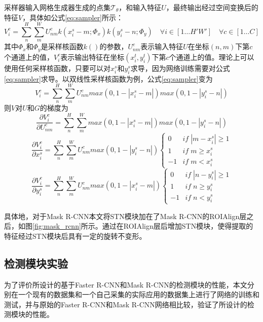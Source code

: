 采样器输入网格生成器生成的点集$\mathcal{T}_\theta$，和输入特征$U$，最终输出经过空间变换后的特征$V$，具体如公式\ref{eq:sampler}所示：
\begin{equation}
  \label{eq:sampler}
  V_i^c = \sum_n^H\sum_m^W{U_{nm}^ck(x_i^s-m;\Phi_x)k(y_i^s-n;\Phi_y)}\quad \forall i\in[1\ldots H'W']\quad \forall c\in[1\ldots C]
\end{equation}
其中$\Phi_{x}$和$\Phi_{y}$是采样核函数$k()$的参数，$U_{nm}^c$表示输入特征$U$在坐标$(n, m)$下第$c$个通道上的值，$V_i^c$表示输出特征在坐标$(x_i^t,y_i^t)$下第$c$个通道上的值。理论上可以使用任何采样核函数，只要可以对$x_i^s$和$y_i^s$求导，因为网络训练需要对公式\ref{eq:sampler}求导。以双线性采样核函数为例，公式\ref{eq:sampler}变为
\begin{equation}
  V_i^c = \sum_n^H\sum_m^W{U_{nm}^cmax(0, 1-|x_i^s-m|)max(0, 1-|y_i^s-n|)}
\end{equation}
则$V$对$U$和$G$的梯度为
\begin{equation}
  \frac{\partial V_i^c}{\partial U_{nm}^c} = \sum_n^H\sum_m^W{max(0, 1-|x_i^s-m|)max(0, 1-|y_i^s-n|)}
\end{equation}
\begin{equation}
  \frac{\partial V_i^c}{\partial x_i^s} = \sum_n^H\sum_m^W{U_{nm}^cmax(0, 1-|y_i^s-n|)}
  \left\{
      \begin{array}{ll}
        0&if\; |m-x_i^s| \geq 1\\
        1&if\; m \geq x_i^s\\
        -1&if\; m < x_i^s
      \end{array}
    \right.
\end{equation}
\begin{equation}
  \frac{\partial V_i^c}{\partial y_i^s} = \sum_n^H\sum_m^W{U_{nm}^cmax(0, 1-|x_i^s-m|)}
  \left\{
      \begin{array}{ll}
        0&if\; |n-y_i^s| \geq 1\\
        1&if\; n \geq y_i^s\\
        -1&if\; n < y_i^s
      \end{array}
    \right.
\end{equation}

具体地，对于Mask R-CNN本文将STN模块加在了Mask R-CNN的ROIAlign层之后，如图\ref{fig:mask_rcnn}所示。通过在ROIAlign层后增加STN模块，使得提取的特征经过STN模块后具有一定的旋转不变形。

\subsection{检测模块实验}
为了评价所设计的基于Faster R-CNN和Mask R-CNN的检测模块的性能，本文分别在一个现有的数据集和一个自己采集的实际应用的数据集上进行了网络的训练和测试，并与原始的Faster R-CNN和Mask R-CNN网络相比较，验证了所设计的检测模块的性能。

